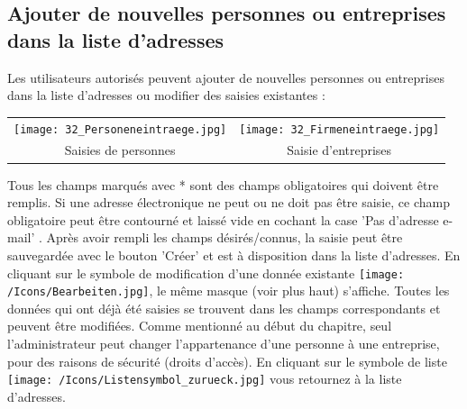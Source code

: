 \subsection{Ajouter de nouvelles personnes ou entreprises dans la liste d'adresses}
Les utilisateurs autorisés peuvent ajouter de nouvelles personnes ou entreprises dans la liste d'adresses ou modifier des saisies existantes :

\vspace{\baselineskip}

\begin{tabular}{cc} %
\texttt{[image: 32\_Personeneintraege.jpg]} & \texttt{[image: 32\_Firmeneintraege.jpg]} \\
Saisies de personnes & Saisie d'entreprises\\
\end{tabular}


\vspace{\baselineskip}
Tous les champs marqués avec * sont des champs obligatoires qui doivent être remplis. Si une adresse électronique ne peut ou ne doit pas être saisie, ce champ obligatoire peut être contourné et laissé vide en cochant la case 'Pas d'adresse e-mail' . Après avoir rempli les champs désirés/connus, la saisie peut être sauvegardée avec le bouton 'Créer'  et est à disposition dans la liste d'adresses. En cliquant sur le symbole de modification d'une donnée existante \texttt{[image: /Icons/Bearbeiten.jpg]}, le même masque (voir plus haut) s'affiche. Toutes les données qui ont déjà été saisies se trouvent dans les champs correspondants et peuvent être modifiées. Comme mentionné au début du chapitre, seul l'administrateur peut changer l'appartenance d'une personne à une entreprise, pour des raisons de sécurité (droits d'accès).\newline
En cliquant sur le symbole de liste \texttt{[image: /Icons/Listensymbol\_zurueck.jpg]}  vous retournez à la liste d'adresses.

